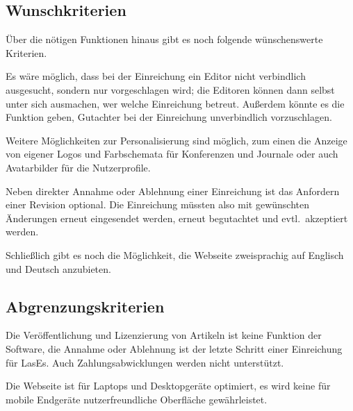 \subsection{Wunschkriterien}

Über die nötigen Funktionen hinaus gibt es noch folgende wünschenswerte Kriterien.

Es wäre möglich, dass bei der Einreichung ein Editor nicht verbindlich ausgesucht, sondern nur vorgeschlagen wird;
die Editoren können dann selbst unter sich ausmachen, wer welche Einreichung betreut.
Außerdem könnte es die Funktion geben, Gutachter bei der Einreichung unverbindlich vorzuschlagen.

Weitere Möglichkeiten zur Personalisierung sind möglich,
zum einen die Anzeige von eigener Logos und Farbschemata für Konferenzen und Journale oder auch Avatarbilder für die Nutzerprofile.

Neben direkter Annahme oder Ablehnung einer Einreichung ist das Anfordern einer Revision optional.
Die Einreichung müssten also mit gewünschten Änderungen erneut eingesendet werden, erneut begutachtet und evtl.\ akzeptiert werden.

Schließlich gibt es noch die Möglichkeit, die Webseite zweisprachig auf Englisch und Deutsch anzubieten.

\subsection{Abgrenzungskriterien}

Die Veröffentlichung und Lizenzierung von Artikeln ist keine Funktion der Software,
die Annahme oder Ablehnung ist der letzte Schritt einer Einreichung für LasEs.
Auch Zahlungsabwicklungen werden nicht unterstützt.

Die Webseite ist für Laptops und Desktopgeräte optimiert, es wird keine für mobile Endgeräte nutzerfreundliche Oberfläche gewährleistet.